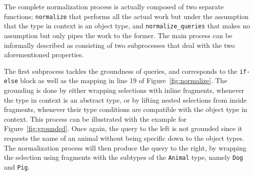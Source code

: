 The complete normalization process is actually composed of two separate functions; \texttt{normalize} that performs all the actual work but under the assumption that the type in context is an object type, and \texttt{normalize\_queries} that makes no assumption but only pipes the work to the former. The main process can be informally described as consisting of two subprocesses that deal with the two aforementioned properties.
\iffalse
\begin{itemize}
    \item Grounding: Selections are either wrapped with inline fragments or lifted from an inline fragment.

    \item Merging: Fields with the same response name have their subqueries merged into a single selection.
    
    
\end{itemize}
\fi

The first subprocess tackles the groundness of queries, and corresponds to the \texttt{if-else} block as well as the mapping in line 19 of Figure~\ref{fig:normalize}. The grounding is done by either wrapping selections with inline fragments, whenever the type in context is an abstract type, or by lifting nested selections from inside fragments, whenever their type conditions are compatible with the object type in context. This process can be illustrated with the example for Figure~\ref{fig:grounded}. Once again, the query to the left is not grounded since it requests the name of an animal without being specific down to the object types. The normalization process will then produce the query to the right, by wrapping the selection using fragments with the subtypes of the \texttt{Animal} type, namely \texttt{Dog} and \texttt{Pig}.

